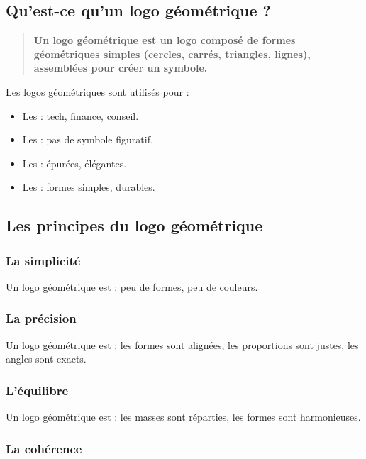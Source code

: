 \subsection{Qu'est-ce qu'un logo géométrique ?}

\begin{quote}
\textbf{Un logo géométrique est un logo composé de formes géométriques simples (cercles, carrés, triangles, lignes), assemblées pour créer un symbole.}
\end{quote}

Les logos géométriques sont utilisés pour :

\begin{itemize}
    \item Les  : tech, finance, conseil.
    \item Les  : pas de symbole figuratif.
    \item Les  : épurées, élégantes.
    \item Les  : formes simples, durables.
\end{itemize}

\subsection{Les principes du logo géométrique}

\subsubsection{La simplicité}

Un logo géométrique est  : peu de formes, peu de couleurs.

\subsubsection{La précision}

Un logo géométrique est  : les formes sont alignées, les proportions sont justes, les angles sont exacts.

\subsubsection{L'équilibre}

Un logo géométrique est  : les masses sont réparties, les formes sont harmonieuses.

\subsubsection{La cohérence}

